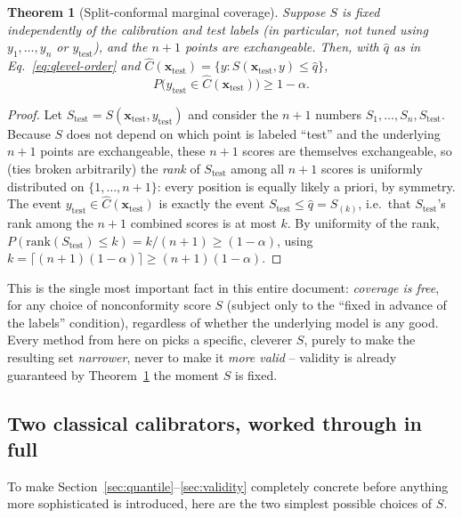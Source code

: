 \documentclass[11pt]{article}
\newtheorem{theorem}{Theorem}[section]
\begin{document}
\begin{theorem}[Split-conformal marginal coverage]
\label{thm:coverage}
Suppose $S$ is fixed independently of the calibration and test labels (in particular, not tuned
using $y_1,\dots,y_n$ or $y_{\mathrm{test}}$), and the $n+1$ points are exchangeable. Then, with
$\hat q$ as in Eq.~\eqref{eq:qlevel-order} and $\hat C(\bm x_{\mathrm{test}}) = \{y :
S(\bm x_{\mathrm{test}}, y) \le \hat q\}$,
\begin{equation}
P\big(y_{\mathrm{test}} \in \hat C(\bm x_{\mathrm{test}})\big) \ge 1-\alpha.
\end{equation}
\end{theorem}
\begin{proof}
Let $S_{\mathrm{test}} = S(\bm x_{\mathrm{test}}, y_{\mathrm{test}})$ and consider the $n+1$
numbers $S_1,\dots,S_n,S_{\mathrm{test}}$. Because $S$ does not depend on which point is labeled
``test'' and the underlying $n+1$ points are exchangeable, these $n+1$ scores are themselves
exchangeable, so (ties broken arbitrarily) the \emph{rank} of $S_{\mathrm{test}}$ among all $n+1$
scores is uniformly distributed on $\{1,\dots,n+1\}$: every position is equally likely a priori,
by symmetry. The event $y_{\mathrm{test}} \in \hat C(\bm x_{\mathrm{test}})$ is exactly the event
$S_{\mathrm{test}} \le \hat q = S_{(k)}$, i.e.\ that $S_{\mathrm{test}}$'s rank among the $n+1$
combined scores is at most $k$. By uniformity of the rank,
$P(\text{rank}(S_{\mathrm{test}}) \le k) = k/(n+1) \ge (1-\alpha)$, using $k = \lceil
(n+1)(1-\alpha)\rceil \ge (n+1)(1-\alpha)$.
\end{proof}

This is the single most important fact in this entire document: \emph{coverage is free}, for any
choice of nonconformity score $S$ (subject only to the ``fixed in advance of the labels''
condition), regardless of whether the underlying model is any good. Every method from here on
picks a specific, cleverer $S$, purely to make the resulting set \emph{narrower}, never to make it
\emph{more valid} -- validity is already guaranteed by Theorem~\ref{thm:coverage} the moment $S$
is fixed.

\subsection{Two classical calibrators, worked through in full}
\label{sec:standardcp}

To make Section~\ref{sec:quantile}--\ref{sec:validity} completely concrete before anything more
sophisticated is introduced, here are the two simplest possible choices of $S$.
\end{document}
